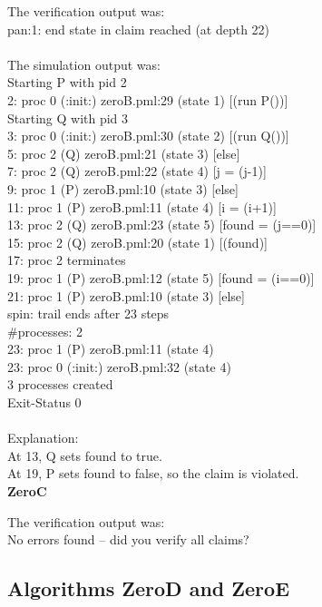 \documentclass[12pt,a4paper]{scrartcl}
\begin{document}
The verification output was:\\
pan:1: end state in claim reached (at depth 22)\\
\\
The simulation output was:\\
Starting P with pid 2\\
  2:    proc  0 (:init:) zeroB.pml:29 (state 1) [(run P())]\\
Starting Q with pid 3\\
  3:    proc  0 (:init:) zeroB.pml:30 (state 2) [(run Q())]\\
  5:    proc  2 (Q) zeroB.pml:21 (state 3)  [else]\\
  7:    proc  2 (Q) zeroB.pml:22 (state 4)  [j = (j-1)]\\
  9:    proc  1 (P) zeroB.pml:10 (state 3)  [else]\\
 11:    proc  1 (P) zeroB.pml:11 (state 4)  [i = (i+1)]\\
 13:    proc  2 (Q) zeroB.pml:23 (state 5)  [found = (j==0)]\\
 15:    proc  2 (Q) zeroB.pml:20 (state 1)  [(found)]\\
 17: proc 2 terminates\\
 19:    proc  1 (P) zeroB.pml:12 (state 5)  [found = (i==0)]\\
 21:    proc  1 (P) zeroB.pml:10 (state 3)  [else]\\
spin: trail ends after 23 steps\\
\#processes: 2\\
 23:    proc  1 (P) zeroB.pml:11 (state 4)\\
 23:    proc  0 (:init:) zeroB.pml:32 (state 4)\\
3 processes created\\
Exit-Status 0\\
\\
Explanation:\\
At 13, Q sets found to true. \\
At 19, P sets found to false, so the claim is violated.\\

\textbf{ZeroC}

The verification output was:\\
No errors found -- did you verify all claims?

\subsection{Algorithms ZeroD and ZeroE}
\end{document}
